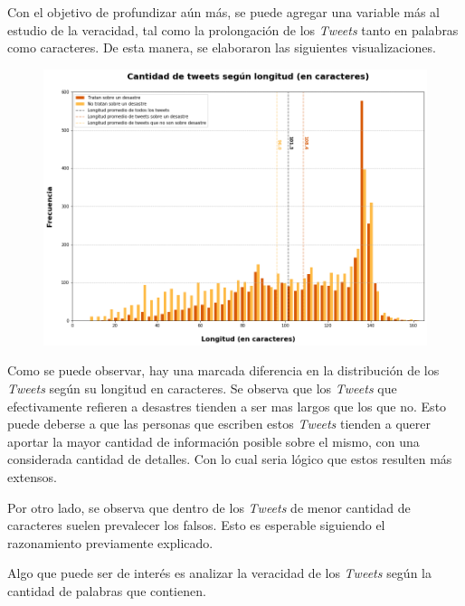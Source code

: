 \documentclass[titlepage,a4paper]{article}
\begin{document}
    Con el objetivo de profundizar aún más, se puede agregar una variable más al estudio de la veracidad, tal como la prolongación de los \textit{Tweets} tanto en palabras como caracteres. De esta manera, se elaboraron las siguientes visualizaciones.

    \begin{figure}[H]
    \centering
    \includegraphics[width=1\textwidth]{graficos/Analisis Lexico Grafico/cantidad_de_tweets_segun_longitud_en_caracteres.png}
    \caption{}
    \end{figure}
    
    Como se puede observar, hay una marcada diferencia en la distribución de los \textit{Tweets} según su longitud en caracteres. Se observa que los \textit{Tweets} que efectivamente refieren a desastres tienden a ser mas largos que los que no. Esto puede deberse a que las personas que escriben estos \textit{Tweets} tienden a querer aportar la mayor cantidad de información posible sobre el mismo, con una considerada cantidad de detalles. Con lo cual seria lógico que estos resulten más extensos.
    
    Por otro lado, se observa que dentro de los \textit{Tweets} de menor cantidad de caracteres suelen prevalecer los falsos. Esto es esperable siguiendo el razonamiento previamente explicado.
    
    Algo que puede ser de interés es analizar la veracidad de los \textit{Tweets} según la cantidad de palabras que contienen.
    
\end{document}
